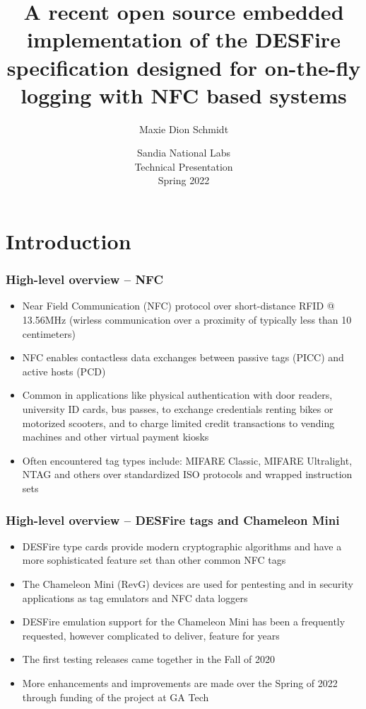 \documentclass[usenames,svgnames,dvipsnames,11pt]{beamer}
\title[Sandia 2022 -- Embedded DESFire]{
     A recent open source embedded implementation of 
     the DESFire specification designed for on-the-fly logging with 
     NFC based systems
}
\author{Maxie Dion Schmidt} %
\institute[] 
{
\texttt{maxieds@gmail.com} \\ 
\url{http://people.math.gatech.edu/~mschmidt34} \\ 
\url{https://github.com/maxieds}
}
\date[Spring 2022]{Sandia National Labs \\ Technical Presentation \\ Spring 2022} %
\begin{document}
\begin{frame}
\titlepage %
\end{frame} 



\section{Introduction} 

\begin{frame}
\frametitle{High-level overview -- NFC}
\begin{itemize} 

\item Near Field Communication (NFC) protocol over short-distance RFID @ 13.56MHz
      (wirless communication over a proximity of typically less than 10 centimeters)
\item NFC enables contactless data exchanges between passive tags (PICC) and active hosts (PCD)
\item Common in applications like physical authentication with door readers, university ID cards, 
      bus passes, to exchange credentials 
      renting bikes or motorized scooters, and to charge limited credit transactions to vending machines 
      and other virtual payment kiosks
\item Often encountered tag types include: MIFARE Classic, MIFARE Ultralight, NTAG and others over 
      standardized ISO protocols and wrapped instruction sets

\end{itemize}

\end{frame}

\begin{frame}
\frametitle{High-level overview -- DESFire tags and Chameleon Mini}

\begin{itemize} 

\item DESFire type cards provide modern cryptographic algorithms and 
      have a more sophisticated feature set than other common NFC tags
\item The Chameleon Mini (RevG) devices are used for pentesting and in 
      security applications as tag emulators and NFC data loggers
\item DESFire emulation support for the Chameleon Mini has been a frequently requested, 
      however complicated to deliver, feature for years
\item The first testing releases came together in the Fall of 2020 
\item More enhancements and improvements are made over the Spring of 2022 through funding of the project 
      at GA Tech

\end{itemize} 

\end{frame}
\end{document}
